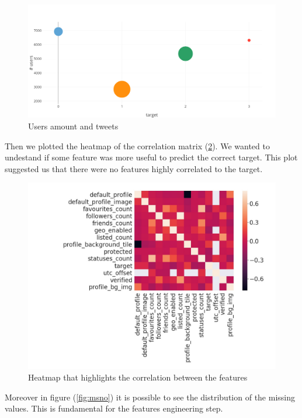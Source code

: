 \begin{figure}[htp!]
	\centering
	\includegraphics[width=\columnwidth]{chapter3/figure/bubble.png}
	\caption{Users amount and tweets}
	\label{fig:bubble}
\end{figure}
\newpage
Then we plotted the heatmap of the correlation matrix (\ref{fig:heatmap}). We wanted to undestand if some feature was more useful to predict the correct target. This plot suggested us that there were no features highly correlated to the target.
\begin{figure}[htp!]
	\centering
	\includegraphics[width=\columnwidth]{chapter3/figure/heatmap.jpg}
	\caption{Heatmap that highlights the correlation between the features}
	\label{fig:heatmap}
\end{figure}

Moreover in figure (\ref{fig:msno}) it is possible to see the distribution of the missing values. This is fundamental for the features engineering step.

